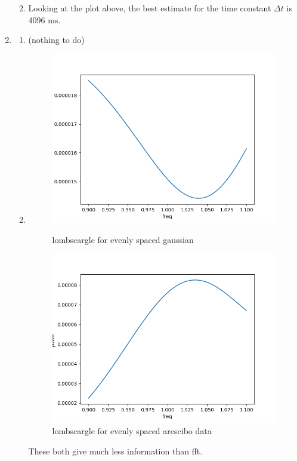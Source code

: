 \documentclass[a4paper,11pt,english]{article}
\begin{document}
\begin{enumerate}
\begin{enumerate}
\begin{figure}[H]
	\end{figure}
		\item Looking at the plot above, the best estimate for the time constant $\Delta t$ is 4096 ms. 
	\end{enumerate}
	\item 
	\begin{enumerate}
		\item (nothing to do)
		\item 
			\begin{figure}[H]
			\includegraphics[width=\linewidth]{ls/gauss}
			\caption{lombscargle for evenly spaced gaussian}
			\endminipage \hfill
			\includegraphics[width=\linewidth]{ls/arescibo}
			\caption{lombscargle for evenly spaced arescibo data}
			\endminipage \hfill
		\end{figure}
	\par These both give much less information than fft.
	

\end{enumerate}
\end{enumerate}
\end{document}
